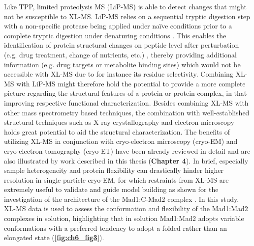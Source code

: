 Like TPP, limited proteolysis MS (LiP-MS) is able to detect changes that might not be susceptible to XL-MS. LiP-MS relies on a sequential tryptic digestion step with a non-specific protease being applied under naïve conditions prior to a complete tryptic digestion under denaturing conditions \cite{RN39, RN40}. This enables the identification of protein structural changes on peptide level after perturbation (e.g. drug treatment, change of nutrients, etc.) \cite{RN41}, thereby providing additional information (e.g. drug targets or metabolite binding sites) which would not be accessible with XL-MS due to for instance its residue selectivity. Combining XL-MS with LiP-MS might therefore hold the potential to provide a more complete picture regarding the structural features of a protein or protein complex, in that improving respective functional characterization.
Besides combining XL-MS with other mass spectrometry based techniques, the combination with well-established structural techniques such as X-ray crystallography and electron microscopy holds great potential to aid the structural characterization. The benefits of utilizing XL-MS in conjunction with cryo-electron microscopy (cryo-EM) and cryo-electron tomography (cryo-ET) have been already reviewed in detail \cite{RN43, RN42, RN44} and are also illustrated by work described in this thesis (\textbf{Chapter 4}). In brief, especially sample heterogeneity and protein flexibility can drastically hinder higher resolution in single particle cryo-EM, for which restraints from XL-MS are extremely useful to validate and guide model building as shown for the investigation of the architecture of the Mad1:C-Mad2 complex \cite{RN45}. In this study, XL-MS data is used to assess the conformation and flexibility of the Mad1:Mad2 complexes in solution, highlighting that in solution Mad1:Mad2 adopts variable conformations with a preferred tendency to adopt a folded rather than an elongated state (\textbf{\autoref{fig:ch6_fig3}}).

